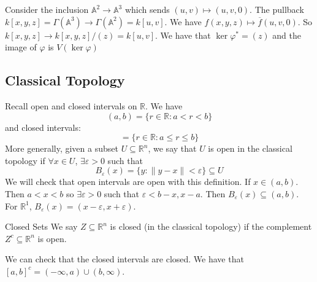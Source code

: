 \documentclass{report}
\begin{document}
\begin{examples}
    \begin{example}
        Consider the inclusion $\mathbb{A}^{2} \rightarrow \mathbb{A}^{3}$ which sends $(u, v) \mapsto (u, v, 0)$. The pullback $k[x, y, z] = \Gamma(\mathbb{A}^{3}) \rightarrow \Gamma(\mathbb{A}^{2}) = k[u, v]$. We have $f(x, y, z) \mapsto \overline{f}(u, v, 0)$. So $k[x, y, z] \rightarrow k[x, y, z]/(z) = k[u, v]$. We have that $\ker{\varphi^{*}} = (z)$ and the image of $\varphi$ is $V(\ker{\varphi})$
    \end{example}
\end{examples}

\begin{topic}
    \section{Classical Topology}
\end{topic}

Recall open and closed intervals on $\mathbb{R}$. We have
    \begin{equation*}
        (a, b) = \{r \in \mathbb{R} : a < r < b\}
    \end{equation*}
and closed intervals:
    \begin{equation*}
        [a, b] = \{r \in \mathbb{R} : a \leq r \leq b\}
    \end{equation*}
More generally, given a subset $U \subseteq \mathbb{R}^{n}$, we say that $U$ is open in the classical topology if $\forall x \in U$, $\exists \varepsilon > 0$ such that 
    \begin{equation*}
        B_{\varepsilon}(x) = \{y : \lVert y - x \rVert <  \varepsilon\} \subseteq U
    \end{equation*}
We will check that open intervals are open with this definition. If $x \in (a, b)$. Then $a < x < b$ so $\exists \varepsilon > 0$ such that $\varepsilon < b - x, x - a$. Then $B_{\varepsilon}(x) \subseteq (a, b)$. For $\mathbb{R}^{1}$, $B_{\varepsilon}(x) = (x - \varepsilon, x + \varepsilon)$.

\begin{definition}{Closed Sets}
    We say $Z \subseteq \mathbb{R}^{n}$ is closed (in the classical topology) if the complement $Z^{c} \subseteq \mathbb{R}^{n}$ is open. 
\end{definition}

We can check that the closed intervals are closed. We have that $[a, b]^{c} = (-\infty, a) \cup (b, \infty)$.
\end{document}
